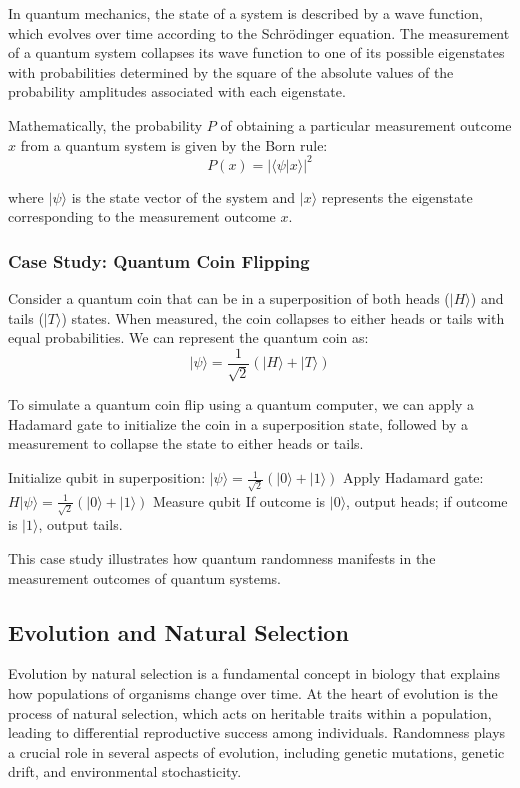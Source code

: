 \documentclass[12pt]{book} %
\begin{document}
In quantum mechanics, the state of a system is described by a wave function, which evolves over time according to the Schrödinger equation. The measurement of a quantum system collapses its wave function to one of its possible eigenstates with probabilities determined by the square of the absolute values of the probability amplitudes associated with each eigenstate.

Mathematically, the probability \(P\) of obtaining a particular measurement outcome \(x\) from a quantum system is given by the Born rule:
\[ P(x) = |\langle \psi | x \rangle |^2 \]

where \(|\psi\rangle\) is the state vector of the system and \(|x\rangle\) represents the eigenstate corresponding to the measurement outcome \(x\).

\subsubsection{Case Study: Quantum Coin Flipping}
Consider a quantum coin that can be in a superposition of both heads (\(|H\rangle\)) and tails (\(|T\rangle\)) states. When measured, the coin collapses to either heads or tails with equal probabilities. We can represent the quantum coin as:
\[ |\psi\rangle = \frac{1}{\sqrt{2}}(|H\rangle + |T\rangle) \]

To simulate a quantum coin flip using a quantum computer, we can apply a Hadamard gate to initialize the coin in a superposition state, followed by a measurement to collapse the state to either heads or tails.

\FloatBarrier
\begin{algorithm}[H]
\caption{Quantum Coin Flip}
\begin{algorithmic}[1]
\State Initialize qubit in superposition: \( |\psi\rangle = \frac{1}{\sqrt{2}}(|0\rangle + |1\rangle) \) 
\State Apply Hadamard gate: \( H|\psi\rangle = \frac{1}{\sqrt{2}}(|0\rangle + |1\rangle) \)
\State Measure qubit
\State If outcome is \(|0\rangle\), output heads; if outcome is \(|1\rangle\), output tails.
\end{algorithmic}
\end{algorithm}
\FloatBarrier

This case study illustrates how quantum randomness manifests in the measurement outcomes of quantum systems.

\subsection{Evolution and Natural Selection}
Evolution by natural selection is a fundamental concept in biology that explains how populations of organisms change over time. At the heart of evolution is the process of natural selection, which acts on heritable traits within a population, leading to differential reproductive success among individuals. Randomness plays a crucial role in several aspects of evolution, including genetic mutations, genetic drift, and environmental stochasticity.
\end{document}
